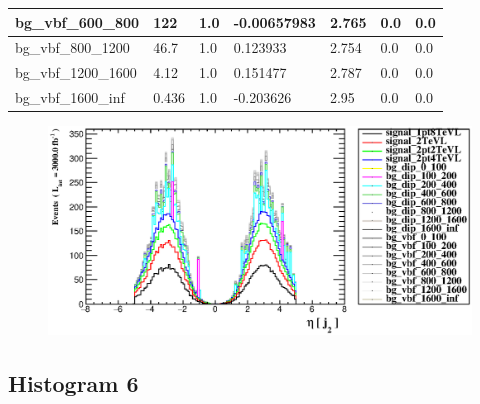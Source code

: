 \documentclass[a4paper, 10pt]{article}
\begin{document}
\begin{table}[H]
\begin{center}
\begin{tabular}{|m{23.0mm}|m{23.0mm}|m{18.0mm}|m{19.0mm}|m{19.0mm}|m{19.0mm}|m{19.0mm}|}
      \hline
      {\cellcolor{white}         bg\_vbf\_600\_800}& {\cellcolor{white}         122}& {\cellcolor{white}         1.0}& {\cellcolor{white}         -0.00657983}& {\cellcolor{white}         2.765}& {\cellcolor{green}         0.0}& {\cellcolor{green}         0.0}\\
      \hline
      {\cellcolor{white}         bg\_vbf\_800\_1200}& {\cellcolor{white}         46.7}& {\cellcolor{white}         1.0}& {\cellcolor{white}         0.123933}& {\cellcolor{white}         2.754}& {\cellcolor{green}         0.0}& {\cellcolor{green}         0.0}\\
      \hline
      {\cellcolor{white}         bg\_vbf\_1200\_1600}& {\cellcolor{white}         4.12}& {\cellcolor{white}         1.0}& {\cellcolor{white}         0.151477}& {\cellcolor{white}         2.787}& {\cellcolor{green}         0.0}& {\cellcolor{green}         0.0}\\
      \hline
      {\cellcolor{white}         bg\_vbf\_1600\_inf}& {\cellcolor{white}         0.436}& {\cellcolor{white}         1.0}& {\cellcolor{white}         -0.203626}& {\cellcolor{white}         2.95}& {\cellcolor{green}         0.0}& {\cellcolor{green}         0.0}\\
\hline
    \end{tabular}
  \end{center}
\end{table}

\begin{figure}[H]
  \begin{center}
    \includegraphics[scale=0.45]{selection_4.eps}\\
\caption{   }
  \end{center}
\end{figure}
      \newpage
\subsection{ Histogram 6}
\end{document}
